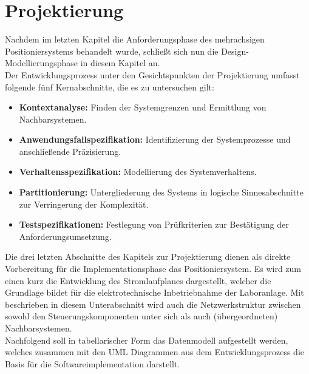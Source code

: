 \documentclass[../../Bachelorarbeit.tex]{subfiles}
\begin{document}
\section{Projektierung}
Nachdem im letzten Kapitel die Anforderungsphase des mehrachsigen Positioniersystems behandelt wurde, schließt sich nun die Design- \bzw Modellierungsphase in diesem Kapitel an.\\
Der Entwicklungsprozess unter den Gesichtspunkten der Projektierung umfasst folgende fünf Kernabschnitte, die es zu untersuchen gilt:

\begin{itemize}
    \item \textbf{Kontextanalyse:} Finden der Systemgrenzen und Ermittlung von Nachbarsystemen.
    \item \textbf{Anwendungsfallspezifikation:} Identifizierung der Systemprozesse und anschließende Präzisierung.
    \item \textbf{Verhaltensspezifikation:} Modellierung des Systemverhaltens.
    \item \textbf{Partitionierung:} Untergliederung des Systems in logische Sinnesabschnitte zur Verringerung der Komplexität.
    \item \textbf{Testspezifikationen:} Festlegung von Prüfkriterien zur Bestätigung der Anforderungsumsetzung.
\end{itemize}

Die drei letzten Abschnitte des Kapitels zur Projektierung dienen als direkte Vorbereitung für die Implementationsphase das Positioniersystem. Es wird zum einen kurz die Entwicklung des Stromlaufplanes dargestellt, welcher die Grundlage bildet für die elektrotechnische Inbetriebnahme der Laboranlage. Mit beschrieben in diesem Unterabschnitt wird auch die Netzwerkstruktur zwischen sowohl den Steuerungskomponenten unter sich als auch (übergeordneten) Nachbarsystemen. \\
Nachfolgend soll in tabellarischer Form das Datenmodell aufgestellt werden, welches zusammen mit den UML Diagrammen aus dem Entwicklungsprozess die Basis für die Softwareimplementation darstellt.
\end{document}
